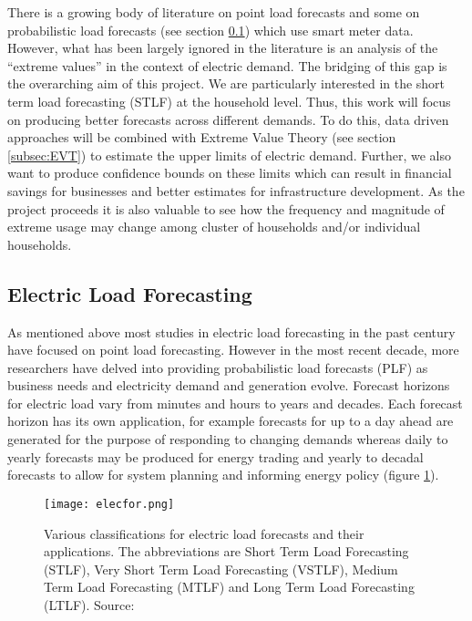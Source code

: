 \documentclass[a4paper]{article}
\begin{document}
There is a growing body of literature on point load forecasts and some on probabilistic load forecasts (see section \ref{subsec:litrev}) which use smart meter data. However, what has been largely ignored in the literature is an analysis of the ``extreme values''  in the context of electric demand. The bridging of this gap is the overarching aim of this project. We are particularly interested in the short term load forecasting (STLF) at the household level. Thus, this work will focus on producing better forecasts across different demands. To do this, data driven approaches will be combined with Extreme Value Theory (see section \ref{subsec:EVT}) to estimate the upper limits of electric demand. Further, we also want to produce confidence bounds on these limits which can result in financial savings for businesses and better estimates for infrastructure development. As the project proceeds it is also valuable to see how the frequency and magnitude of extreme usage may change among cluster of households and/or individual households.




\subsection{Electric Load Forecasting}
\label{subsec:litrev}
As mentioned above most studies in electric load forecasting in the past century have focused on point load forecasting. However in the most recent decade, more researchers have delved into providing probabilistic load forecasts (PLF) as business needs and electricity demand and generation evolve. Forecast horizons for electric load vary from minutes and hours to years and decades. Each forecast horizon has its own application, for example forecasts for up to a day ahead are generated for the purpose of responding to changing demands whereas daily to yearly forecasts may be produced for energy trading and yearly to decadal forecasts to allow for system planning and informing energy policy (figure \ref{fig:elecfor}).

\begin{figure}
\centering
\texttt{[image: elecfor.png]}
\caption{Various classifications for electric load forecasts and their applications. The abbreviations are Short Term Load Forecasting (STLF), Very Short Term Load Forecasting (VSTLF), Medium Term Load Forecasting (MTLF) and Long Term Load Forecasting (LTLF). Source: \cite{hong16}}
\label{fig:elecfor} 
\end{figure}
\end{document}
